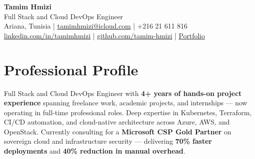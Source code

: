 \documentclass[10pt, letterpaper]{article}
\begin{document}
{\fontsize{22}{22}\selectfont \textbf{Tamim Hmizi}} \\[4pt]
{\large Full Stack and Cloud DevOps Engineer} \\[6pt]
Ariana, Tunisia \;|\;
\href{mailto:tamimhmizi@icloud.com}{tamimhmizi@icloud.com} \;|\;
+216 21 611 816 \\
\href{https://linkedin.com/in/tamimhmizi}{linkedin.com/in/tamimhmizi} \;|\;
\href{https://github.com/tamim-hmizi}{github.com/tamim-hmizi} \;|\;
\href{https://tamim-hmizi.github.io/Portfolio/}{Portfolio}

\vspace{0.4cm}

\section{Professional Profile}
Full Stack and Cloud DevOps Engineer with \textbf{4+ years of hands-on project experience} spanning freelance work, academic projects, and internships --- now operating in full-time professional roles.
Deep expertise in Kubernetes, Terraform, CI/CD automation, and cloud-native architecture across Azure, AWS, and OpenStack.
Currently consulting for a \textbf{Microsoft CSP Gold Partner} on sovereign cloud and infrastructure security --- delivering \textbf{70\% faster deployments} and \textbf{40\% reduction in manual overhead}.

\end{document}
